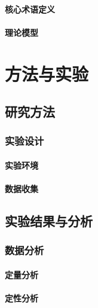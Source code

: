 \documentclass{USTBBook}
\begin{document}
\subsection{核心术语定义}
\zhlipsum[8]

\subsection{理论模型}
\zhlipsum[9]

\part{方法与实验}
\ToggleSectionStyle

\chapter{研究方法}
\zhlipsum[10]

\section{实验设计}
\zhlipsum[11]

\subsection{实验环境}
\zhlipsum[12]

\subsection{数据收集}
\zhlipsum[13]

\chapter{实验结果与分析}
\zhlipsum[14]

\section{数据分析}
\zhlipsum[15]

\subsection{定量分析}
\zhlipsum[16]

\subsection{定性分析}
\zhlipsum[17]
\end{document}
